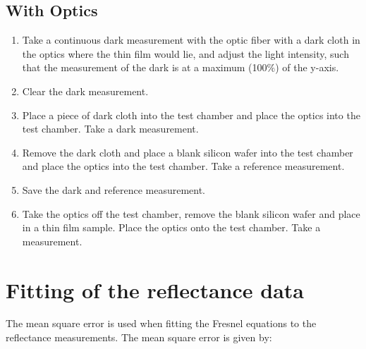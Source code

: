 \documentclass[MasterThesisMain.tex]{subfiles}
\begin{document}
\subsection{With Optics}
\begin{enumerate}
\item Take a continuous dark measurement with the optic fiber with a dark cloth in the optics where the thin film would lie, and adjust the light intensity, such that the measurement of the dark is at a maximum (100$\%$) of the y-axis.
\item Clear the dark measurement.
\item Place a piece of dark cloth into the test chamber and place the optics into the test chamber. Take a dark measurement.
\item Remove the dark cloth and place a blank silicon wafer into the test chamber and place the optics into the test chamber. Take a reference measurement.
\item Save the dark and reference measurement.
\item Take the optics off the test chamber, remove the blank silicon wafer and place in a thin film sample. Place the optics onto the test chamber. Take a measurement.
\end{enumerate}

\section{Fitting of the reflectance data} \label{sec:fitting}
The mean square error is used when fitting the Fresnel equations to the reflectance measurements. The mean square error is given by:
\end{document}
